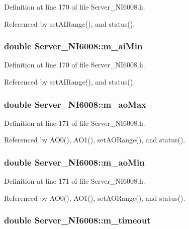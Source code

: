 Definition at line 170 of file Server\_\-NI6008.h.

Referenced by setAIRange(), and status().\hypertarget{classServer__NI6008_af0fea276566b46d56f235bece151af78}{
\subsubsection[{m\_\-aiMin}]{\setlength{\rightskip}{0pt plus 5cm}double {\bf Server\_\-NI6008::m\_\-aiMin}}}
\label{classServer__NI6008_af0fea276566b46d56f235bece151af78}


Definition at line 170 of file Server\_\-NI6008.h.

Referenced by setAIRange(), and status().\hypertarget{classServer__NI6008_a228a5d51f43daaf9eaea8e77cfa3334e}{
\subsubsection[{m\_\-aoMax}]{\setlength{\rightskip}{0pt plus 5cm}double {\bf Server\_\-NI6008::m\_\-aoMax}}}
\label{classServer__NI6008_a228a5d51f43daaf9eaea8e77cfa3334e}


Definition at line 171 of file Server\_\-NI6008.h.

Referenced by AO0(), AO1(), setAORange(), and status().\hypertarget{classServer__NI6008_ad650503ceebacea17688e04065130eaa}{
\subsubsection[{m\_\-aoMin}]{\setlength{\rightskip}{0pt plus 5cm}double {\bf Server\_\-NI6008::m\_\-aoMin}}}
\label{classServer__NI6008_ad650503ceebacea17688e04065130eaa}


Definition at line 171 of file Server\_\-NI6008.h.

Referenced by AO0(), AO1(), setAORange(), and status().\hypertarget{classServer__NI6008_a782b89c4483096900a3c02f1b1fc2c2f}{
\subsubsection[{m\_\-timeout}]{\setlength{\rightskip}{0pt plus 5cm}double {\bf Server\_\-NI6008::m\_\-timeout}}}
\label{classServer__NI6008_a782b89c4483096900a3c02f1b1fc2c2f}



